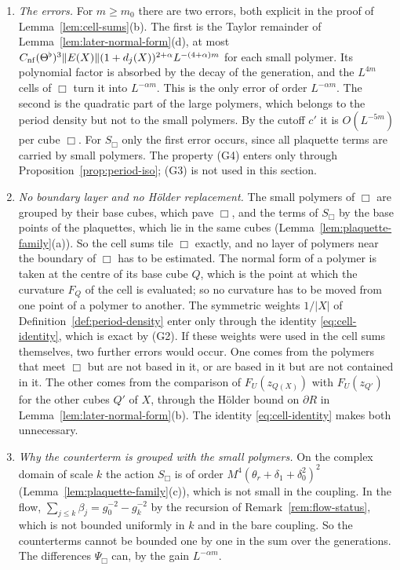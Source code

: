 \begin{remark}\label{rem:extraction}
\begin{enumerate}[label=(\alph*)]
\item \emph{The errors.} For $m\ge m_0$ there are two errors, both explicit in the proof of Lemma~\ref{lem:cell-sums}(b). The first is the Taylor remainder of Lemma~\ref{lem:later-normal-form}(d), at most $C_{\rm nf}(\Theta^\flat)^3\|E(X)\|(1+d_j(X))^{2+\alpha}L^{-(4+\alpha)m}$ for each small polymer. Its polynomial factor is absorbed by the decay of the generation, and the $L^{4m}$ cells of $\Box$ turn it into $L^{-\alpha m}$. This is the only error of order $L^{-\alpha m}$. The second is the quadratic part of the large polymers, which belongs to the period density but not to the small polymers. By the cutoff $c'$ it is $O(L^{-5m})$ per cube $\Box$. For $S_\Box$ only the first error occurs, since all plaquette terms are carried by small polymers. The property (G4) enters only through Proposition~\ref{prop:period-iso}; (G3) is not used in this section.
\item \emph{No boundary layer and no H\"older replacement.} The small polymers of $\Box$ are grouped by their base cubes, which pave $\Box$, and the terms of $S_\Box$ by the base points of the plaquettes, which lie in the same cubes (Lemma~\ref{lem:plaquette-family}(a)). So the cell sums tile $\Box$ exactly, and no layer of polymers near the boundary of $\Box$ has to be estimated. The normal form of a polymer is taken at the centre of its base cube $Q$, which is the point at which the curvature $F_Q$ of the cell is evaluated; so no curvature has to be moved from one point of a polymer to another. The symmetric weights $1/|X|$ of Definition~\ref{def:period-density} enter only through the identity \eqref{eq:cell-identity}, which is exact by (G2). If these weights were used in the cell sums themselves, two further errors would occur. One comes from the polymers that meet $\Box$ but are not based in it, or are based in it but are not contained in it. The other comes from the comparison of $F_U(z_{Q(X)})$ with $F_U(z_{Q'})$ for the other cubes $Q'$ of $X$, through the H\"older bound on $\partial R$ in Lemma~\ref{lem:later-normal-form}(b). The identity \eqref{eq:cell-identity} makes both unnecessary.
\item \emph{Why the counterterm is grouped with the small polymers.} On the complex domain of scale $k$ the action $S_\Box$ is of order $M^4(\theta_r+\delta_1+\delta_0^2)^2$ (Lemma~\ref{lem:plaquette-family}(c)), which is not small in the coupling. In the flow, $\sum_{j\le k}\beta_j=g_0^{-2}-g_k^{-2}$ by the recursion of Remark~\ref{rem:flow-status}, which is not bounded uniformly in $k$ and in the bare coupling. So the counterterms cannot be bounded one by one in the sum over the generations. The differences $\Psi_\Box$ can, by the gain $L^{-\alpha m}$.

\end{enumerate}
\end{remark}
